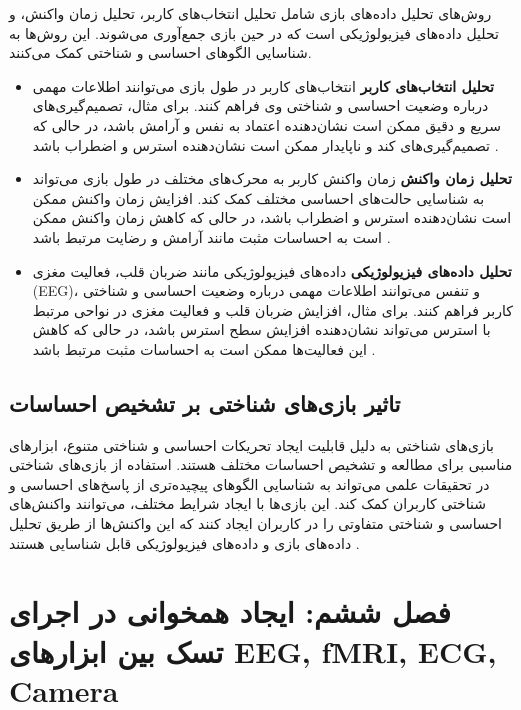 \documentclass[12pt]{article}
\begin{document}
روش‌های تحلیل داده‌های بازی شامل تحلیل انتخاب‌های کاربر، تحلیل زمان واکنش، و تحلیل داده‌های فیزیولوژیکی است که در حین بازی جمع‌آوری می‌شوند. این روش‌ها به شناسایی الگوهای احساسی و شناختی کمک می‌کنند.
\begin{itemize}

\item \textbf{تحلیل انتخاب‌های کاربر}  انتخاب‌های کاربر در طول بازی می‌توانند اطلاعات مهمی درباره وضعیت احساسی و شناختی وی فراهم کنند. برای مثال، تصمیم‌گیری‌های سریع و دقیق ممکن است نشان‌دهنده اعتماد به نفس و آرامش باشد، در حالی که تصمیم‌گیری‌های کند و ناپایدار ممکن است نشان‌دهنده استرس و اضطراب باشد \cite{Cowley2008}.

\item \textbf{تحلیل زمان واکنش}  زمان واکنش کاربر به محرک‌های مختلف در طول بازی می‌تواند به شناسایی حالت‌های احساسی مختلف کمک کند. افزایش زمان واکنش ممکن است نشان‌دهنده استرس و اضطراب باشد، در حالی که کاهش زمان واکنش ممکن است به احساسات مثبت مانند آرامش و رضایت مرتبط باشد \cite{Mandryk2007}.

\item \textbf{تحلیل داده‌های فیزیولوژیکی}  داده‌های فیزیولوژیکی مانند ضربان قلب، فعالیت مغزی (EEG)، و تنفس می‌توانند اطلاعات مهمی درباره وضعیت احساسی و شناختی کاربر فراهم کنند. برای مثال، افزایش ضربان قلب و فعالیت مغزی در نواحی مرتبط با استرس می‌تواند نشان‌دهنده افزایش سطح استرس باشد، در حالی که کاهش این فعالیت‌ها ممکن است به احساسات مثبت مرتبط باشد \cite{Fairclough2009}.
\end{itemize}

\subsection{تاثیر بازی‌های شناختی بر تشخیص احساسات}

بازی‌های شناختی به دلیل قابلیت ایجاد تحریکات احساسی و شناختی متنوع، ابزارهای مناسبی برای مطالعه و تشخیص احساسات مختلف هستند. استفاده از بازی‌های شناختی در تحقیقات علمی می‌تواند به شناسایی الگوهای پیچیده‌تری از پاسخ‌های احساسی و شناختی کاربران کمک کند. این بازی‌ها با ایجاد شرایط مختلف، می‌توانند واکنش‌های احساسی و شناختی متفاوتی را در کاربران ایجاد کنند که این واکنش‌ها از طریق تحلیل داده‌های بازی و داده‌های فیزیولوژیکی قابل شناسایی هستند \cite{He2020}.

\section{فصل ششم: ایجاد همخوانی در اجرای تسک بین ابزارهای EEG, fMRI, ECG, Camera}
\end{document}
